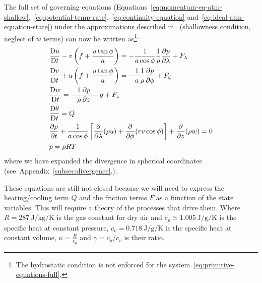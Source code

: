 The full set of governing equations (Equations~\ref{eq:momentum-eq-atm-shallow},~\ref{eq:potential-temp-rate},~\ref{eq:continuity-equation} and~\ref{eq:ideal-atm-equation-state})
under the approximations described in~\secref{\ref{subsec:momentum-equation-atm}}
(shallowness condition, neglect of $w$ terms) can now be written as\footnote{The hydrostatic condition is not enforced
	for the system~\ref{eq:primitive-equations-full}.}:
\begin{subequations}
	\begin{align}
		 & \frac{\mathrm{D} u}{\mathrm{D}t} - v\left(f +  \frac{u \tan{\phi}}{a}\right)  = -\frac{1}{ a \cos{\phi}}\frac{1}{\rho}\frac{\partial p}{\partial \lambda}   + F_\lambda                                                      \\
		 & \frac{\mathrm{D} v}{\mathrm{D}t} + u\left( f + \frac{u \tan{\phi}}{a}\right)  = -\frac{1}{a}\frac{1}{\rho}\frac{\partial p}{\partial \phi}  + F_\phi                                                                         \\
		 & \frac{\mathrm{D} w}{\mathrm{D}t}  = -\frac{1}{\rho }\frac{\partial p}{\partial z} -g  + F_z \label{Eq:PrimEq}                                                                                                                \\
		 & \frac{\mathrm{D} \theta}{\mathrm{D}t} = Q                                                                                                                                                                                    \\
		 & \frac{\partial \rho}{\partial t}+\frac{1}{a\cos{\phi}}\left[ \frac{\partial }{\partial \lambda}(\rho u) + \frac{\partial }{\partial \phi}(rv\cos{\phi} )\right] +\frac{\partial }{\partial z}(\rho w) = 0 \\
		 & p = \rho R T
	\end{align}
	\label{eq:primitive-equations-full}
\end{subequations}
where we have expanded the divergence in spherical coordinates (see~Appendix~\ref{subsec:divergence}.).

These equations are still not closed because we will need to express the heating/cooling term \(Q\) and the friction terms \(F\)
as a function of the state variables.
This will require a theory of the processes that drive them.
Where \(R= \qty{287}{\joule \per\kilo\gram \per \kelvin}\) is the gas constant for dry air and
\(c_p \simeq \qty{1.005}{\joule \per \gram \per \kelvin}\) is the specific heat at constant pressure, \(c_v = \qty{0.718}{\joule \per \gram \per \kelvin}\) is the specific heat at constant volume, \(\kappa = \frac{R}{c_p}\) and \(\gamma=c_p/c_v\) is their ratio.


